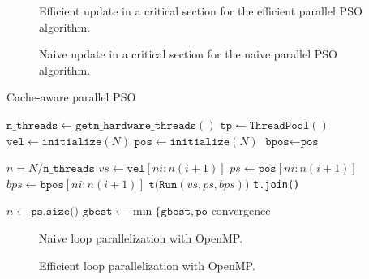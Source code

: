 \begin{figure}
  
  \caption{Efficient update in a critical section for the efficient parallel PSO
    algorithm.}
  \label{fig:efficient-update}
\end{figure}

\begin{figure}
  
  \caption{Naive update in a critical section for the naive parallel PSO
    algorithm.}
  \label{fig:naive-update}
\end{figure}

\begin{algorithm}
  \caption{Cache-aware parallel PSO}\label{alg:par-pso}
  \begin{algorithmic}[1]
    \State $\texttt{n\_threads} \gets \texttt{getn\_hardware\_threads}()$
    \State $\texttt{tp} \gets \texttt{ThreadPool}()$
    \State $\texttt{vel} \gets \texttt{initialize}(N)$
    \State $\texttt{pos} \gets \texttt{initialize}(N)$
    \State $\texttt{bpos} \gets \texttt{pos}$

    \State $n = N/\texttt{n\_threads}$ 
    \State $vs \gets \texttt{vel}[ni:n(i+1)]$
    \State $ps \gets \texttt{pos}[ni:n(i+1)]$
    \State $bps \gets \texttt{bpos}[ni:n(i+1)]$
    \State $\texttt{t(Run}(vs, ps, bps))$
    \EndFor
    \State \texttt{t.join()}
    \EndFor
    \EndProcedure
  \end{algorithmic}
  \begin{algorithmic}[1]
    \State $n \gets \texttt{ps.size()}$
    \Repeat
    \State $\texttt{gbest} \gets \min\{\texttt{gbest}, \texttt{po}$
    \EndFor
    \State 
    \EndFor
    \Until convergence
    \EndProcedure
  \end{algorithmic}
\end{algorithm}

\begin{figure}
  
  \caption{Naive loop parallelization with OpenMP.}\label{fig:naive-par}
\end{figure}

\begin{figure}
  
  \caption{Efficient loop parallelization with OpenMP.}\label{fig:efficient-par}
\end{figure}

